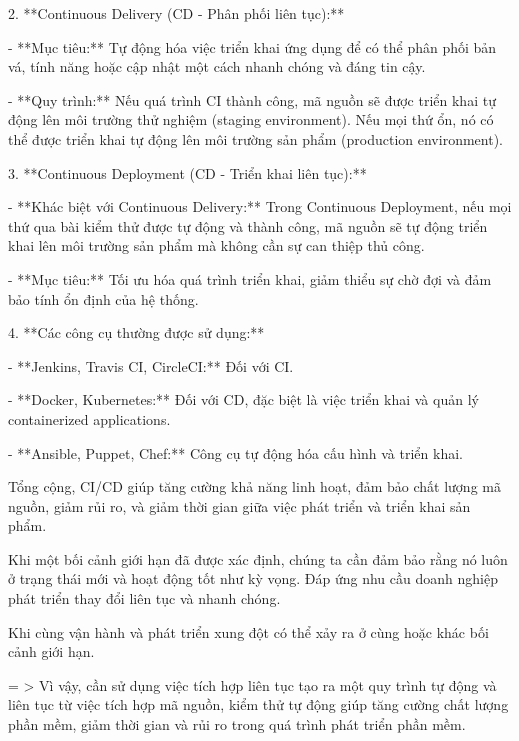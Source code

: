2. **Continuous Delivery (CD - Phân phối liên tục):**

- **Mục tiêu:** Tự động hóa việc triển khai ứng dụng để có thể phân phối bản vá, tính năng hoặc cập nhật một cách nhanh chóng và đáng tin cậy.

- **Quy trình:** Nếu quá trình CI thành công, mã nguồn sẽ được triển khai tự động lên môi trường thử nghiệm (staging environment). Nếu mọi thứ ổn, nó có thể được triển khai tự động lên môi trường sản phẩm (production environment).

3. **Continuous Deployment (CD - Triển khai liên tục):**

- **Khác biệt với Continuous Delivery:** Trong Continuous Deployment, nếu mọi thứ qua bài kiểm thử được tự động và thành công, mã nguồn sẽ tự động triển khai lên môi trường sản phẩm mà không cần sự can thiệp thủ công.

- **Mục tiêu:** Tối ưu hóa quá trình triển khai, giảm thiểu sự chờ đợi và đảm bảo tính ổn định của hệ thống.

4. **Các công cụ thường được sử dụng:**

- **Jenkins, Travis CI, CircleCI:** Đối với CI.

- **Docker, Kubernetes:** Đối với CD, đặc biệt là việc triển khai và quản lý containerized applications.

- **Ansible, Puppet, Chef:** Công cụ tự động hóa cấu hình và triển khai.

Tổng cộng, CI/CD giúp tăng cường khả năng linh hoạt, đảm bảo chất lượng mã nguồn, giảm rủi ro, và giảm thời gian giữa việc phát triển và triển khai sản phẩm.











Khi một bối cảnh giới hạn đã được xác định, chúng ta cần đảm bảo rằng nó luôn ở trạng thái mới và hoạt động tốt như kỳ vọng. Đáp ứng nhu cầu doanh nghiệp phát triển thay đổi liên tục và nhanh chóng.

Khi cùng vận hành và phát triển xung đột có thể xảy ra ở cùng hoặc khác bối cảnh giới hạn.

= > Vì vậy, cần sử dụng việc tích hợp liên tục tạo ra một quy trình tự động và liên tục từ việc tích hợp mã nguồn, kiểm thử tự động giúp tăng cường chất lượng phần mềm, giảm thời gian và rủi ro trong quá trình phát triển phần mềm.

